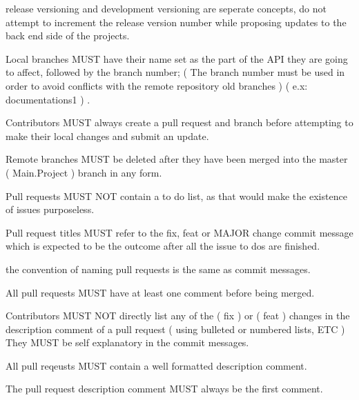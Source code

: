 \documentclass[13pt]{scrarticle}
\newcommand{\nexusrule}[1]{\Tribar[1][white][yellow][red]\color{blue} #1}
\begin{document}
      \nexusrule{ release versioning and development versioning are seperate concepts, do not attempt to increment the release version number while proposing updates to the back end side of the projects.} \newline

      \nexusrule{ Local branches MUST have their name set as the part of the API they are going to affect, followed by the branch number; ( The branch number must be used in order to avoid conflicts with the remote repository old branches ) ( e.x: documentations1 ) .} \newline

      \nexusrule{ Contributors MUST always create a pull request and branch before attempting to make their local changes and submit an update.} \newline

      \nexusrule{ Remote branches MUST be deleted after they have been merged into the master ( Main.Project ) branch in any form.} \newline

      \nexusrule{ Pull requests MUST NOT contain a to do list, as that would make the existence of issues purposeless.} \newline

      \nexusrule{ Pull request titles MUST refer to the fix, feat or MAJOR change commit message which is expected to be the outcome after all the issue to dos are finished.} \newline

      \nexusrule{ the convention of naming pull requests is the same as commit messages.} \newline

      \nexusrule{ All pull requests MUST have at least one comment before being merged.} \newline

      \nexusrule{ Contributors MUST NOT directly list any of the ( fix ) or ( feat ) changes in the description comment of a pull request ( using bulleted or numbered lists, ETC ) They MUST be self explanatory in the commit messages.} \newline

      \nexusrule{ All pull reqeusts MUST contain a well formatted description comment.} \newline

      \nexusrule{ The pull request description comment MUST always be the first comment.} \newline
\end{document}
